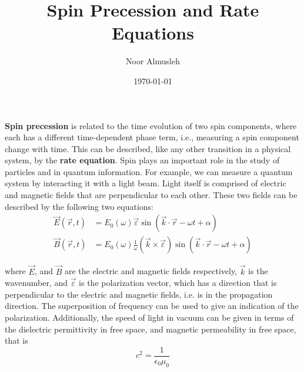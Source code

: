\documentclass{article}
\title{Spin Precession and Rate Equations}
\author{Noor Almusleh}
\date{\today}
\newcommand{\textw}[1]{{\color{amber!70}#1}}
\begin{document}
\maketitle


\textbf{Spin precession} is related to the time evolution of two spin components, where each has a different time-dependent phase term, i.e., measuring a spin component change with time. This can be described, like any other transition in a physical system, by the \textbf{rate equation}. Spin plays an important role in the study of particles and in quantum information. For example, we can measure a quantum system by interacting it with a light beam. Light itself is comprised of electric and magnetic fields that are perpendicular to each other. These two fields can be described by the following two equations:
\begin{align}
    \label{eq:E}
    \Vec{E} (\Vec{r}, t) &= E_0(\omega) \Vec{\varepsilon}\sin(\Vec{k}\cdot\Vec{r} - \omega t + \alpha) \\
    \label{eq:B}
    \Vec{B} (\Vec{r}, t) &= E_0(\omega) \frac{1}{\omega} (\Vec{k} \times \Vec{\varepsilon}) \sin(\Vec{k}\cdot\Vec{r} - \omega t + \alpha)
\end{align}

where $\Vec{E}$, and $\Vec{B}$ are the electric and magnetic fields respectively, $\Vec{k}$ is the wavenumber, and $\Vec{\varepsilon}$ is the polarization vector, which has a \textw{direction that is perpendicular to the electric and magnetic fields, i.e. is in the propagation direction}. The superposition of frequency can be used to give \textw{an indication of the polarization.} Additionally, the speed of light in vacuum can be given in terms of the dielectric permittivity in free space, and magnetic permeability in free space, that is
\begin{equation}
    c^2 = \frac{1}{\epsilon_0 \mu_0}
\end{equation}
\end{document}
